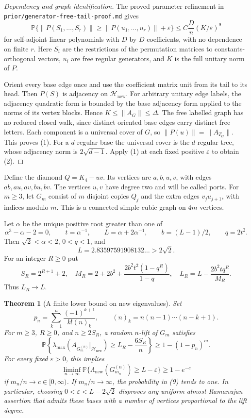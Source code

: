 \documentclass[11pt]{article}
\newtheorem{theorem}{Theorem}
\newcommand{\Prb}{\mathbb P}
\newcommand{\newsp}{\mathcal H_{\mathrm{new}}}
\begin{document}
\begin{proof}[Dependency and graph identification]
The proved parameter refinement in
\texttt{prior/generator-free-tail-proof.md} gives
\[
 \Prb\{\|P(S_1,\ldots,S_r)\|\geq\|P(u_1,\ldots,u_r)\|+
 \varepsilon\}
 \leq C\frac Dn(K/\varepsilon)^9
 \tag{3}
\]
for self-adjoint linear polynomials with $D$ by $D$ coefficients, with
no dependence on finite $r$. Here $S_i$ are the restrictions of the
permutation matrices to constants-orthogonal vectors, $u_i$ are free
regular generators, and $K$ is the full unitary norm of $P$.

Orient every base edge once and use the coefficient matrix unit from its
tail to its head. Then $P(S)$ is adjacency on $\newsp$. For arbitrary
unitary edge labels, the adjacency quadratic form is bounded by the base
adjacency form applied to the norms of its vertex blocks. Hence
$K\leq\|A_G\|\leq\Delta$. The free labelled graph has no reduced closed
walk, since distinct oriented base edges carry distinct free letters.
Each component is a universal cover of $G$, so
$\|P(u)\|=\|A_{T_G}\|$. This proves (1).
For a $d$-regular base the universal cover is the $d$-regular tree, whose
adjacency norm is $2\sqrt{d-1}$. Apply (1) at each fixed positive
$\varepsilon$ to obtain (2).
\end{proof}

Define the diamond $Q=K_4-uv$. Its vertices are $a,b,u,v$, with edges
$ab,au,av,bu,bv$. The vertices $u,v$ have degree two and will be called
ports. For $m\geq3$, let $G_m$ consist of $m$ disjoint copies $Q_j$
and the extra edges $v_j u_{j+1}$, with indices modulo $m$. This is a
connected simple cubic graph on $4m$ vertices.

Let $\alpha$ be the unique positive root greater than one of
\[
 \alpha^3-\alpha-2=0,
 \qquad t=\alpha^{-1},\qquad
 L=\alpha+2\alpha^{-1},\qquad b=(L-1)/2,
 \qquad q=2t^2.
 \tag{4}
\]
Then $\sqrt2<\alpha<2$, $0<q<1$, and
\[
 L=2.83597591908132\ldots>2\sqrt2.
 \tag{5}
\]
For an integer $R\geq0$ put
\[
 S_R=2^{R+1}+2,
 \quad M_R=2+2b^2+
          \frac{2b^2t^2(1-q^R)}{1-q},
 \quad L_R=L-\frac{2b^2tq^R}{M_R}.
 \tag{6}
\]
Thus $L_R\to L$.

\begin{theorem}[A finite lower bound on new eigenvalues]
Set
\[
 p_n=\sum_{k=1}^n\frac{(-1)^{k+1}}{k!(n)_k},
 \qquad (n)_k=n(n-1)\cdots(n-k+1).
 \tag{7}
\]
For $m\geq3$, $R\geq0$, and $n\geq2S_R$, a random $n$-lift of $G_m$
satisfies
\[
 \Prb\left\{
 \lambda_{\max}(A_{G_m^{(n)}}|_{\newsp})
       \geq L_R-\frac{6S_R}{n}\right\}
 \geq 1-(1-p_n)^m.
 \tag{8}
\]
For every fixed $\varepsilon>0$, this implies
\[
 \liminf_{n\to\infty}
 \Prb\{\Lambda_{\mathrm{new}}(G_{m_n}^{(n)})\geq L-\varepsilon\}
 \geq1-e^{-c}
 \tag{9}
\]
if $m_n/n\to c\in[0,\infty)$. If $m_n/n\to\infty$, the probability
in (9) tends to one. In particular, choosing
$0<\varepsilon<L-2\sqrt2$ disproves any uniform almost-Ramanujan
assertion that admits these bases with a number of vertices proportional
to the lift degree.
\end{theorem}
\end{document}
